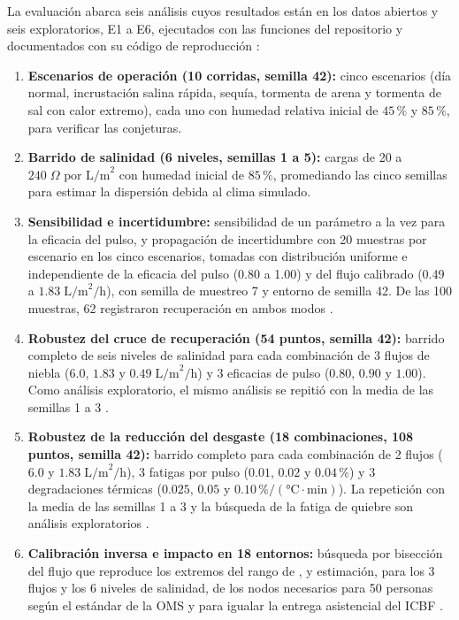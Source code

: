 La evaluaci\'on abarca seis an\'alisis cuyos resultados est\'an en los datos abiertos y seis exploratorios, E1 a E6, ejecutados con las funciones del repositorio y documentados con su c\'odigo de reproducci\'on \parencite[doc.~04, \S\S~8.13--8.14]{axioma2026engine}:
\begin{enumerate}[leftmargin=*]
  \item \textbf{Escenarios de operaci\'on (10 corridas, semilla 42):} cinco escenarios (d\'ia normal, incrustaci\'on salina r\'apida, sequ\'ia, tormenta de arena y tormenta de sal con calor extremo), cada uno con humedad relativa inicial de $45\,\%$ y $85\,\%$, para verificar las conjeturas.
  \item \textbf{Barrido de salinidad (6 niveles, semillas 1 a 5):} cargas de 20 a $240\;\Omega\text{ por L/m}^2$ con humedad inicial de $85\,\%$, promediando las cinco semillas para estimar la dispersi\'on debida al clima simulado.
  \item \textbf{Sensibilidad e incertidumbre:} sensibilidad de un par\'ametro a la vez para la eficacia del pulso, y propagaci\'on de incertidumbre con 20 muestras por escenario en los cinco escenarios, tomadas con distribuci\'on uniforme e independiente de la eficacia del pulso (0.80 a 1.00) y del flujo calibrado (0.49 a $1.83\;\text{L/m}^2\text{/h}$), con semilla de muestreo 7 y entorno de semilla 42. De las 100 muestras, 62 registraron recuperaci\'on en ambos modos \parencite[doc.~04, \S~8.7]{axioma2026engine}.
  \item \textbf{Robustez del cruce de recuperaci\'on (54 puntos, semilla 42):} barrido completo de seis niveles de salinidad para cada combinaci\'on de 3 flujos de niebla ($6.0$, $1.83$ y $0.49\;\text{L/m}^2\text{/h}$) y 3 eficacias de pulso ($0.80$, $0.90$ y $1.00$). Como an\'alisis exploratorio, el mismo an\'alisis se repiti\'o con la media de las semillas 1 a 3 \parencite[doc.~04, \S~8.8]{axioma2026engine}.
  \item \textbf{Robustez de la reducci\'on del desgaste (18 combinaciones, 108 puntos, semilla 42):} barrido completo para cada combinaci\'on de 2 flujos ($6.0$ y $1.83\;\text{L/m}^2\text{/h}$), 3 fatigas por pulso ($0.01$, $0.02$ y $0.04\,\%$) y 3 degradaciones t\'ermicas ($0.025$, $0.05$ y $0.10\,\%/(\si{\celsius}\cdot\text{min})$). La repetici\'on con la media de las semillas 1 a 3 y la b\'usqueda de la fatiga de quiebre son an\'alisis exploratorios \parencite[doc.~04, \S~8.11]{axioma2026engine}.
  \item \textbf{Calibraci\'on inversa e impacto en 18 entornos:} b\'usqueda por bisecci\'on del flujo que reproduce los extremos del rango de \textcite{klemm2012fog}, y estimaci\'on, para los 3 flujos y los 6 niveles de salinidad, de los nodos necesarios para 50 personas seg\'un el est\'andar de la OMS y para igualar la entrega asistencial del ICBF \parencite{icbf2025agua}.

\end{enumerate}
